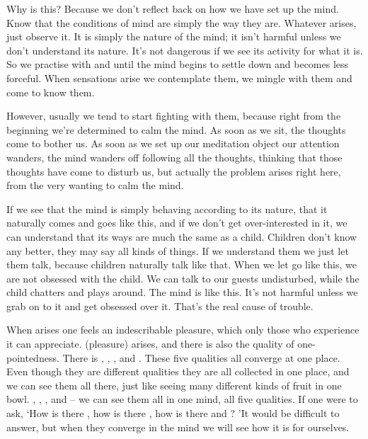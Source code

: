 Why is this? Because we don't reflect back on how we have set up the mind. Know that the conditions of mind are simply the way they are. Whatever arises, just observe it. It is simply the nature of the mind; it isn't harmful unless we don't understand its nature. It's not dangerous if we see its activity for what it is. So we practise with  and  until the mind begins to settle down and becomes less forceful. When sensations arise we contemplate them, we mingle with them and come to know them.

However, usually we tend to start fighting with them, because right from the beginning we're determined to calm the mind. As soon as we sit, the thoughts come to bother us. As soon as we set up our meditation object our attention wanders, the mind wanders off following all the thoughts, thinking that those thoughts have come to disturb us, but actually the problem arises right here, from the very wanting to calm the mind.

If we see that the mind is simply behaving according to its nature, that it naturally comes and goes like this, and if we don't get over-interested in it, we can understand that its ways are much the same as a child. Children don't know any better, they may say all kinds of things. If we understand them we just let them talk, because children naturally talk like that. When we let go like this, we are not obsessed with the child. We can talk to our guests undisturbed, while the child chatters and plays around. The mind is like this. It's not harmful unless we grab on to it and get obsessed over it. That's the real cause of trouble.

When  arises one feels an indescribable pleasure, which only those who experience it can appreciate.  (pleasure) arises, and there is also the quality of one-pointedness. There is , , ,  and . These five qualities all converge at one place. Even though they are different qualities they are all collected in one place, and we can see them all there, just like seeing many different kinds of fruit in one bowl. , , ,  and  -- we can see them all in one mind, all five qualities. If one were to ask, `How is there , how is there , how is there  and ? 'It would be difficult to answer, but when they converge in the mind we will see how it is for ourselves.

